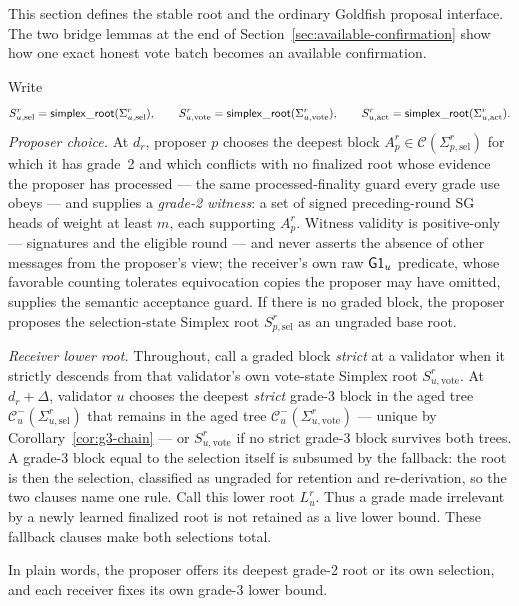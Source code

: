This section defines the stable root and the ordinary Goldfish proposal
interface.  The two bridge lemmas at the end of
Section~\ref{sec:available-confirmation} show how one exact honest vote
batch becomes
an available confirmation.


\begin{definition}\label{def:grade-root-choice}
Write
\[
 S_{u,\mathrm{sel}}^r=
 \mathsf{simplex\_root}(\Sigma_{u,\mathrm{sel}}^r),
 \qquad
 S_{u,\mathrm{vote}}^r=
 \mathsf{simplex\_root}(\Sigma_{u,\mathrm{vote}}^r),
 \qquad
 S_{u,\mathrm{act}}^r=
 \mathsf{simplex\_root}(\Sigma_{u,\mathrm{act}}^r).
\]
\emph{Proposer choice.}
At \(d_r\), proposer \(p\) chooses the deepest block
\(A_p^r\in\mathcal C(\Sigma_{p,\mathrm{sel}}^r)\) for which it has grade~2
and which conflicts with no finalized root whose evidence the proposer
has processed --- the same processed-finality guard every grade use
obeys --- and supplies a \emph{grade-2 witness}: a set of signed preceding-round SG
heads of weight at least \(m\), each supporting \(A_p^r\).  Witness
validity is positive-only --- signatures and the eligible round --- and
never asserts the absence of other messages from the proposer's view;
the receiver's own raw \(\mathsf{G1}_u\) predicate, whose favorable counting
tolerates equivocation copies the proposer may have omitted, supplies the
semantic acceptance guard.  If there is no graded block, the proposer
proposes the selection-state Simplex root \(S_{p,\mathrm{sel}}^r\) as an
ungraded base root.

\emph{Receiver lower root.}
Throughout,
call a graded block \emph{strict} at a validator when it strictly
descends from that validator's own vote-state Simplex root
\(S_{u,\mathrm{vote}}^r\).  At \(d_r+\Delta\), validator \(u\) chooses
the deepest \emph{strict} grade-3 block in the aged tree
\(\mathcal C^{-}_u(\Sigma_{u,\mathrm{sel}}^r)\) that remains in the aged
tree \(\mathcal C^{-}_u(\Sigma_{u,\mathrm{vote}}^r)\) --- unique by
Corollary~\ref{cor:g3-chain} --- or
\(S_{u,\mathrm{vote}}^r\) if no strict grade-3 block survives both
trees.  A grade-3 block equal to the selection itself is subsumed by the
fallback: the root is then the selection, classified as ungraded for
retention and re-derivation, so the two clauses name one rule.
Call this lower root \(L_u^r\).  Thus a grade made irrelevant by a newly
learned finalized root is not retained as a live lower bound.  These fallback
clauses make both selections total.

In plain words, the proposer offers its deepest grade-2 root or its own
selection, and each receiver fixes its own grade-3 lower bound.
\end{definition}

